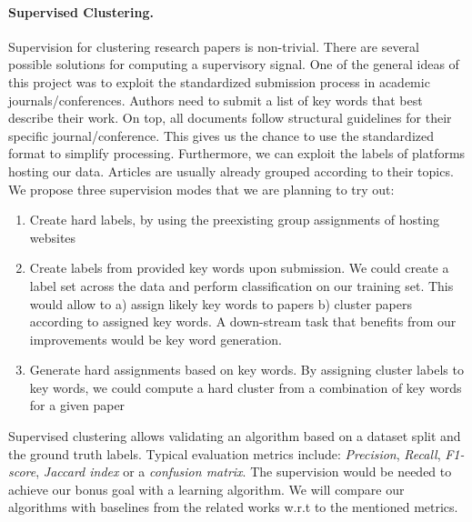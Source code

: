 \paragraph{Supervised Clustering.}
Supervision for clustering research papers is non-trivial. There are several possible solutions for computing a supervisory signal. One of the general ideas of this project was to exploit the standardized submission process in academic journals/conferences. Authors need to submit a list of key words that best describe their work. On top, all documents follow structural guidelines for their specific journal/conference. This gives us the chance to use the standardized format to simplify processing. Furthermore, we can exploit the labels of platforms hosting our data. Articles are usually already grouped according to their topics. We propose three supervision modes that we are planning to try out: 
\begin{enumerate}
	\item Create hard labels, by using the preexisting group assignments of hosting websites
	\item Create labels from provided key words upon submission. We could create a label set across the data and perform classification on our training set. This would allow to a) assign likely key words to papers b) cluster papers according to assigned key words. A down-stream task that benefits from our improvements would be key word generation.
	\item Generate hard assignments based on key words. By assigning cluster labels to key words, we could compute a hard cluster from a combination of key words for a given paper
\end{enumerate}

Supervised clustering allows validating an algorithm based on a dataset split and the ground truth labels. Typical evaluation metrics include: \textit{Precision}, \textit{Recall}, \textit{F1-score}, \textit{Jaccard index} or a \textit{confusion matrix}. The supervision would be needed to achieve our bonus goal with a learning algorithm. We will compare our algorithms with baselines from the related works w.r.t to the mentioned metrics.